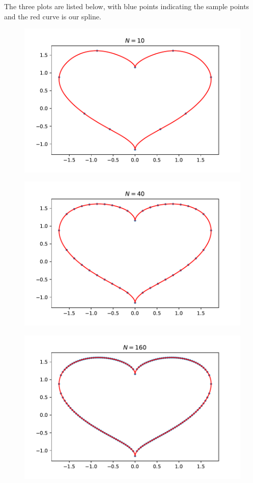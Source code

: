 \documentclass[12pt]{article}
\begin{document}
        The three plots are listed below, with blue points indicating the sample points and
        the red curve is our spline.

        \begin{figure}[H]
            \centering
            \includegraphics{pics/E_10}
        \end{figure}
        \begin{figure}[H]
            \centering
            \includegraphics{pics/E_40}
        \end{figure}
        \begin{figure}[H]
            \centering
            \includegraphics{pics/E_160}
        \end{figure}
\end{document}
